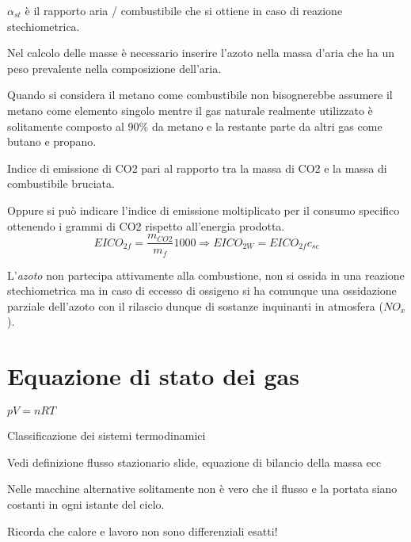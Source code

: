 $\alpha_{st}$ è il rapporto aria / combustibile che si ottiene in caso di
reazione stechiometrica.

Nel calcolo delle masse è necessario inserire l'azoto nella massa d'aria che ha
un peso prevalente nella composizione dell'aria.

Quando si considera il metano come combustibile non bisognerebbe assumere il
metano come elemento singolo mentre il gas naturale realmente utilizzato è
solitamente composto al 90\% da metano e la restante parte da altri gas come
butano e propano.

Indice di emissione di CO2 pari al rapporto tra la massa di CO2 e la massa di
combustibile bruciata.

Oppure si può indicare l'indice di emissione moltiplicato per il consumo
specifico ottenendo i grammi di CO2 rispetto all'energia prodotta.
$$
EICO_{2f} = \frac{m_{CO2}}{m_f}1000 \Rightarrow EICO_{2W} = EICO_{2f}c_{sc}
$$

L'\textit{azoto} non partecipa attivamente alla combustione, non si ossida in
una reazione stechiometrica ma in caso di eccesso di ossigeno si ha comunque
una ossidazione parziale dell'azoto con il rilascio dunque di sostanze
inquinanti in atmosfera ($NO_x$).

\section{Equazione di stato dei gas}

$pV = nRT$

Classificazione dei sistemi termodinamici


Vedi definizione flusso stazionario slide, equazione di bilancio della massa
ecc

Nelle macchine alternative solitamente non è vero che il flusso e la portata
siano costanti in ogni istante del ciclo.

Ricorda che calore e lavoro non sono differenziali esatti!



